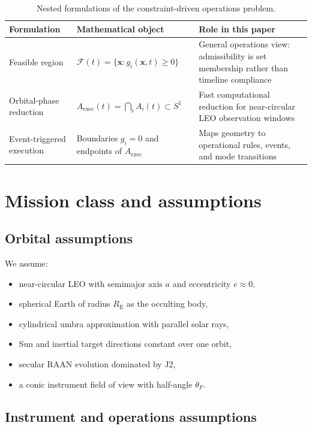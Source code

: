 \documentclass[preprint,12pt]{elsarticle}
\newcommand{\Rearth}{R_{\mathrm{E}}}
\theoremstyle{definition}
\theoremstyle{remark}
\begin{document}
\begin{table}[t]
\centering
\caption{Nested formulations of the constraint-driven operations problem.}
\label{tab:nested_formulations}
\small
\begin{tabular}{p{3.0cm}p{5.0cm}p{5.3cm}}
\toprule
Formulation & Mathematical object & Role in this paper \\
\midrule
Feasible region & $\mathcal{F}(t)=\{\mathbf{x}:g_i(\mathbf{x},t)\ge 0\}$ & General operations view: admissibility is set membership rather than timeline compliance \\
Orbital-phase reduction & $A_{\mathrm{exec}}(t)=\bigcap_i A_i(t)\subset S^1$ & Fast computational reduction for near-circular LEO observation windows \\
Event-triggered execution & Boundaries $g_i=0$ and endpoints of $A_{\mathrm{exec}}$ & Maps geometry to operational rules, events, and mode transitions \\
\bottomrule
\end{tabular}
\end{table}

\section{Mission class and assumptions}
\label{sec:assumptions}

\subsection{Orbital assumptions}

We assume:
\begin{itemize}
\item near-circular LEO with semimajor axis $a$ and eccentricity $e \approx 0$,
\item spherical Earth of radius $\Rearth$ as the occulting body,
\item cylindrical umbra approximation with parallel solar rays,
\item Sun and inertial target directions constant over one orbit,
\item secular RAAN evolution dominated by J2,
\item a conic instrument field of view with half-angle $\theta_F$.
\end{itemize}

\subsection{Instrument and operations assumptions}
\end{document}
